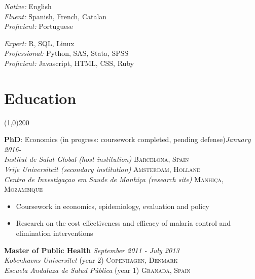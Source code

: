 \documentclass[11pt]{article}
\begin{document}
\begin{multicols}{2}

\noindent \emph{Native:} English\\
\noindent \emph{Fluent:} Spanish, French, Catalan\\
\noindent \emph{Proficient:} Portuguese

\vfill
\columnbreak


\noindent \emph{Expert:} R, SQL, Linux\\
\noindent \emph{Professional:} Python, SAS, Stata, SPSS\\
\noindent \emph{Proficient:} Javascript, HTML, CSS, Ruby


\end{multicols}



\section*{Education} %
\vspace{-7mm}
\line(1,0){200}
\vspace{2mm}

\noindent \textbf{PhD}: Economics (in progress: coursework completed, pending defense)\hfill \emph{January 2016-}\\
\noindent \emph{Institut de Salut Global (host institution)} \hfill \textsc{Barcelona, Spain} \\
\noindent \emph{Vrije Universiteit (secondary institution)} \hfill \textsc{Amsterdam, Holland} \\
\noindent \emph{Centro de Investigaçao em Saude de Manhiça (research site)} \hfill \textsc{Manhiça, Mozambique}

\vspace{-2mm}
\begin{itemize}\itemsep0pt \parskip0pt 
\item Coursework in economics, epidemiology, evaluation and policy
\item Research on the cost effectiveness and efficacy of malaria control and elimination interventions
\end{itemize}
\noindent \textbf{Master of Public Health} \hfill \emph{September 2011 - July 2013} \\
\noindent \emph{Kobenhavns Universitet} (year 2) \hfill \textsc{Copenhagen, Denmark} \\
\noindent \emph{Escuela Andaluza de Salud Pública} (year 1) \hfill \textsc{Granada, Spain}
\end{document}
